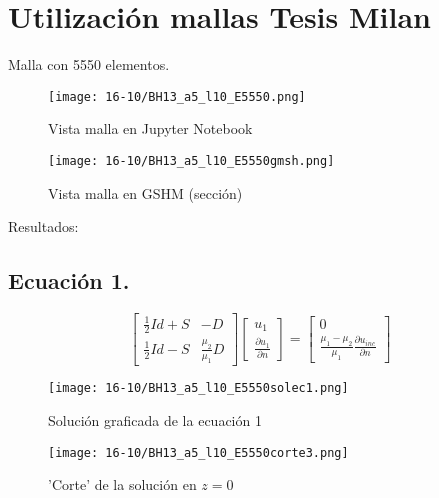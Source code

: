 \documentclass[11pt]{report}
\begin{document}
%
%
%
%
%
%
%
%
%
%
%
\section{Utilización mallas Tesis Milan}
Malla con 5550 elementos.
\begin{figure}[H]
\centering
\texttt{[image: 16-10/BH13\_a5\_l10\_E5550.png]}
\caption{Vista malla en Jupyter Notebook}
\end{figure}
\begin{figure}[H]
\centering
\texttt{[image: 16-10/BH13\_a5\_l10\_E5550gmsh.png]}
\caption{Vista malla en GSHM (sección)}
\end{figure}
Resultados:
\subsection{Ecuación 1.}
$$\begin{bmatrix}
\frac{1}{2}Id+S & -D\\
\frac{1}{2}Id-S & \frac{\mu_2}{\mu_1}D
\end{bmatrix}
\begin{bmatrix}
u_1\\
\frac{\partial u_1}{\partial n}
\end{bmatrix}
=
\begin{bmatrix}
0\\
\frac{\mu_1-\mu_2}{\mu_1}\frac{\partial u_{inc}}{\partial n}
\end{bmatrix}$$
\begin{figure}[H]
\centering
\texttt{[image: 16-10/BH13\_a5\_l10\_E5550solec1.png]}
\caption{Solución graficada de la ecuación 1}
\end{figure}
\begin{figure}[H]
\centering
\texttt{[image: 16-10/BH13\_a5\_l10\_E5550corte3.png]}
\caption{'Corte' de la solución en $z=0$}
\end{figure}
\end{document}
